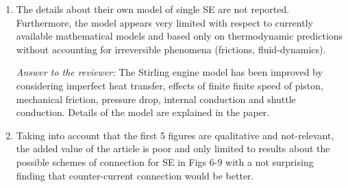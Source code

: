 \documentclass[12pt]{letter}
\begin{document}
\begin{enumerate}
\item The details about their own model of single SE are not reported. Furthermore, the model appears very limited with respect to currently available mathematical models and based only on thermodynamic predictions without accounting for irreversible phenomena (frictions, fluid-dynamics).

\begin{snugshade*}
\emph{Answer to the reviewer:} 
The Stirling engine model has been improved by considering imperfect heat transfer, effects of finite finite speed of piston, mechanical friction, pressure drop, internal conduction and shuttle conduction. Details of the model are explained in the paper.
\end{snugshade*}

\item Taking into account that the first 5 figures are qualitative and not-relevant, the added value of the article is poor and only limited to results about the possible schemes of connection for SE in Figs 6-9 with a not surprising finding that counter-current connection would be better.


\end{enumerate}
\end{document}
